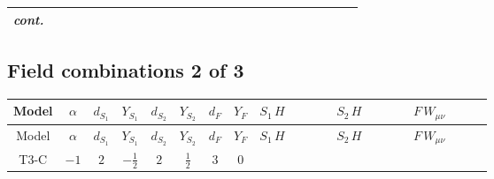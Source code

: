 \documentclass[8pt]{article}
\begin{document}
\begin{landscape}
\begin{longtable}{@{}cccccccc >{\raggedright\arraybackslash}p{0.21\linewidth} >{\raggedright\arraybackslash}p{0.21\linewidth} >{\raggedright\arraybackslash}p{0.21\linewidth}@{}}
\textit{cont.} &  &  &  &  &  &  &  & \scriptsize\adjustbox{max width=\linewidth}{$\begin{gathered} -\frac{4 \hbar  \log \left(\frac{\bar{\mu}^{2}}{m_2^2}\right) \overline{\lambda_5} H_{a_1} H_{a_2} m_2^2 \lambda_5 H_{a_1}{}^{\dagger } H_{a_2}{}^{\dagger }}{3 \left(m_1^2-m_2^2\right)}\end{gathered}$} &  &  \\
\midrule
\bottomrule
\end{longtable}
\clearpage
\subsection*{Field combinations 2 of 3}
\begin{longtable}{@{}cccccccc >{\raggedright\arraybackslash}p{0.21\linewidth} >{\raggedright\arraybackslash}p{0.21\linewidth} >{\raggedright\arraybackslash}p{0.21\linewidth}@{}}
\toprule
Model & $\alpha$ & $d_{S_1}$ & $Y_{S_1}$ & $d_{S_2}$ & $Y_{S_2}$ & $d_F$ & $Y_F$ & $S_1\,H$ & $S_2\,H$ & $F\,W_{\mu\nu}$ \\
\midrule
\endfirsthead
\toprule
Model & $\alpha$ & $d_{S_1}$ & $Y_{S_1}$ & $d_{S_2}$ & $Y_{S_2}$ & $d_F$ & $Y_F$ & $S_1\,H$ & $S_2\,H$ & $F\,W_{\mu\nu}$ \\
\midrule
\endhead
T3-C & $-1$ & $2$ & $-\frac{1}{2}$ & $2$ & $\frac{1}{2}$ & $3$ & $0$ & \scriptsize\adjustbox{max width=\linewidth}{$\begin{gathered} +\frac{\hbar  H_{a_1} H_{a_2} H_{a_1}{}^{\dagger } H_{a_2}{}^{\dagger } \left(\lambda_{HS_1}^{(1)}^{(1)}\right){}^2}{2 \epsilon } \\ +\frac{1}{2} \hbar  \log \left(\frac{\bar{\mu}^{2}}{m_1^2}\right) H_{a_1} H_{a_2} H_{a_1}{}^{\dagger } H_{a_2}{}^{\dagger } \left(\lambda_{HS_1}^{(1)}^{(1)}\right){}^2 \\ +\frac{5 \hbar  H_{a_1} H_{a_2} H_{a_1}{}^{\dagger } H_{a_2}{}^{\dagger } \left(\lambda_{HS_1}^{(1)}^{(2)}\right){}^2}{6 \epsilon }\end{gathered}$} & \scriptsize\adjustbox{max width=\linewidth}{$\begin{gathered} +\frac{\hbar  H_{a_1} H_{a_2} H_{a_1}{}^{\dagger } H_{a_2}{}^{\dagger } \left(\lambda_{HS_2}^{(1)}^{(1)}\right){}^2}{2 \epsilon } \\ +\frac{1}{2} \hbar  \log \left(\frac{\bar{\mu}^{2}}{m_2^2}\right) H_{a_1} H_{a_2} H_{a_1}{}^{\dagger } H_{a_2}{}^{\dagger } \left(\lambda_{HS_2}^{(1)}^{(1)}\right){}^2 \\ +\frac{5 \hbar  H_{a_1} H_{a_2} H_{a_1}{}^{\dagger } H_{a_2}{}^{\dagger } \left(\lambda_{HS_2}^{(1)}^{(2)}\right){}^2}{6 \epsilon }\end{gathered}$} & \scriptsize\adjustbox{max width=\linewidth}{$\begin{gathered} -\hbar  \log \left(\frac{\bar{\mu}^{2}}{M_F^2}\right) \left(W_{\mu _1\mu _2}^{A_1}\right){}^2\end{gathered}$} \\

\end{longtable}
\end{landscape}
\end{document}

